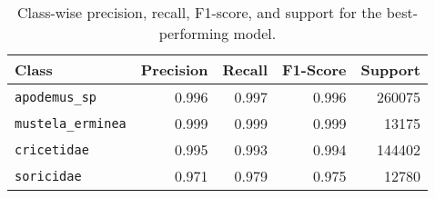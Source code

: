 \begin{table}[H]
\centering
\caption{Class-wise precision, recall, F1-score, and support for the best-performing model.}
\label{tab:precision_recall_fscore_support}
\begin{tabular}{l r r r r}
\toprule
Class & Precision & Recall & F1-Score & Support \\
\midrule
\texttt{apodemus\_sp} & 0.996 & 0.997 & 0.996 & 260075 \\
\texttt{mustela\_erminea} & 0.999 & 0.999 & 0.999 & 13175 \\
\texttt{cricetidae} & 0.995 & 0.993 & 0.994 & 144402 \\
\texttt{soricidae} & 0.971 & 0.979 & 0.975 & 12780 \\
\bottomrule
\end{tabular}
\end{table}